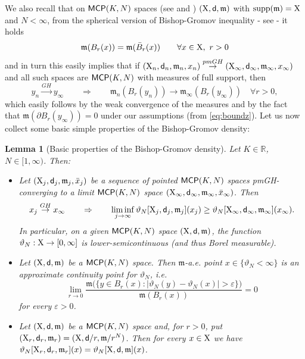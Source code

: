 \documentclass[reqno,11pt]{article}
\numberwithin{equation}{section}
\newcommand{\R}{\mathbb{R}}
\newcommand{\mm}{{\mbox{\boldmath$m$}}}
\newcommand{\sfd}{{\sf d}}
\newcommand{\supp}{\mathop{\rm supp}\nolimits}   %
\newcommand{\eps}{\varepsilon}
\renewcommand{\mm}{\mathfrak m}                                %
\newtheorem{lemma}[theorem]{Lemma}
\newcommand{\X}{{\rm X}}
\newcommand{\MCP}{{\sf MCP}}
\begin{document}
We also recall that on $\MCP(K,N)$ spaces {(see \cite{Ohta07} and \cite{Sturm06II})} $(\X,\sfd,\mm)$ with $\supp(\mm)=\X$ and $N<\infty$, from the spherical version of Bishop-Gromov inequality  - see \cite[Inequality (2.4)]{Sturm06II} -  it holds
\begin{equation}
\label{eq:boundz}
\mm(B_r(x))=\mm(\bar B_r(x))\qquad\forall x\in\X,\ r>0
\end{equation} 
and in turn this easily implies that if  $(\X_n,\sfd_n,\mm_n,x_n)\stackrel{pmGH}\to(\X_\infty,\sfd_\infty,\mm_\infty,x_\infty)$ and all such spaces are $\MCP(K,N)$ with measures of full support, then
\begin{equation}
\label{eq:convballs}
y_n\stackrel{GH}\to y_\infty\qquad\Rightarrow\qquad\mm_n(B_r(y_n))\to \mm_\infty(B_r(y_\infty))\quad\forall r>0,
\end{equation}
{
which easily follows by the weak convergence of the measures and by the fact that \(\mm (\partial B_{r}(y_\infty))=0\) under our assumptions { (from \eqref{eq:boundz})}.
}
Let us now collect some basic simple properties of the Bishop-Gromov density:
\begin{lemma}[Basic properties of the Bishop-Gromov density]\label{lm:propt} Let  \(K\in \R\), \( N\in [1,\infty)\). Then: 
\begin{itemize}
\item[(i)] Let  \((\X_j,\sfd_j,\mm_j,\bar x_j)\) be a sequence of pointed \(\MCP(K,N)\) spaces pmGH-converging to a limit $\MCP(K,N)$ space \((\X_\infty,\sfd_\infty,\mm_\infty,\bar x_\infty)\). Then 
\[
x_j\stackrel{GH}\to x_\infty\qquad\Rightarrow\qquad\liminf_{j\to \infty} \vartheta_N[\X_j,\sfd_j,\mm_j](x_j) \ge \vartheta_N[\X_\infty,\sfd_\infty,\mm_\infty](x_\infty).
\]
In particular, on a given $\MCP(K,N)$ space $(\X,\sfd,\mm)$, the function $\vartheta_N:\X\to[0,\infty]$  is  lower-semicontinuous (and thus Borel measurable).
\item[(ii)] Let $(\X,\sfd,\mm)$ be  a $\MCP(K,N)$ space. Then \(\mm\)-a.e. point \(x\in \{\vartheta_N<\infty\}\) is an approximate continuity point for \(\vartheta_N\), i.e.
\begin{equation}\label{e:contt}
\lim_{r\to 0} \frac{\mm\Big(\big\{y\in B_r(x): |\vartheta_N(y)-\vartheta_N(x)|>\varepsilon\big\}\Big)}{\mm(B_r(x))}=0
\end{equation}
for every \(\eps>0\).
\item[(iii)]  Let $(\X,\sfd,\mm)$ be  a $\MCP(K,N)$ space and, for \(r>0\),  put \((\X_r,\sfd_r,\mm_r)=(\X,\sfd/r,\mm/r^N)\). Then for every \(x\in \X\) we have \(\vartheta_N[\X_r,\sfd_r,\mm_r](x)=\vartheta_N[\X,\sfd,\mm](x)\).
\end{itemize}
\end{lemma}
\end{document}
